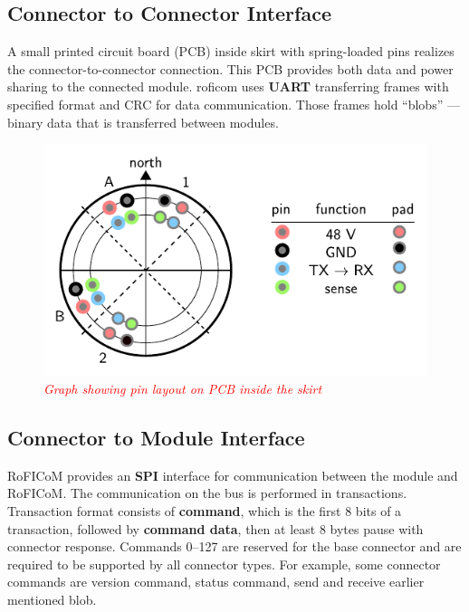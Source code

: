 \documentclass[
  digital,     %
  oneside,     %
  nosansbold,  %
  nocolorbold, %
  lof,         %
  lot,         %
]{fithesis4}
\newcommand{\TODO}[1]{\textcolor{red}{\textit{#1}}}
\begin{document}
\subsection{ Connector to Connector Interface }

A small printed circuit board (PCB) inside skirt with spring-loaded pins realizes the connector-to-connector connection. This PCB provides both
data and power sharing to the connected module.
\acrshort{roficom} uses \textbf{UART} transferring frames with specified format and CRC for data communication. Those frames hold ``blobs'' ---
binary data that is transferred between modules. 

\begin{figure}
    \includegraphics{ skirt_pins.pdf }
    \caption{ \TODO{Graph showing pin layout on PCB inside the skirt} }
\end{figure}

\subsection{ Connector to Module Interface }
RoFICoM provides an \textbf{SPI} interface for communication between the module and RoFICoM. The communication on the bus is performed
in transactions. Transaction format consists of \textbf{command}, which is the first 8 bits of a transaction, followed by \textbf{command
data}, then at least 8 bytes pause with connector response. Commands \numrange{0}{127} are reserved for the base connector and are required to be supported by all
connector types. For example, some connector commands are version command, status command, send and receive earlier
mentioned blob.
\end{document}
